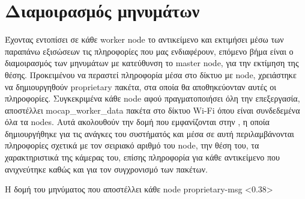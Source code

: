 \section{Διαμοιρασμός μηνυμάτων}
Έχοντας εντοπίσει σε κάθε worker node το αντικείμενο και εκτιμήσει μέσω των παραπάνω εξισώσεων τις πληροφορίες που μας ενδιαφέρουν, επόμενο βήμα είναι ο διαμοιρασμός των μηνυμάτων με κατεύθυνση το master node, για την εκτίμηση της θέσης. Προκειμένου να περαστεί πληροφορία μέσα στο δίκτυο με node, χρειάστηκε να δημιουργηθούν proprietary πακέτα, στα οποία θα αποθηκεύονταν αυτές οι πληροφορίες. Συγκεκριμένα κάθε node αφού πραγματοποιήσει όλη την επεξεργασία, α\-πο\-στέ\-λλει mocap\_worker\_data πακέτα στο δίκτυο Wi-Fi όπου είναι συνδεδεμένα όλα τα nodes. Αυτά ακολουθούν την δομή που εμφανίζονται στην , η οποία δημιουργήθηκε για τις ανάγκες του συστήματός και μέσα σε αυτή πε\-ρι\-λα\-μβά\-νο\-νται πληροφορίες σχετικά με τον σειριακό αριθμό του node, την θέση του, τα χα\-ρα\-κτη\-ρι\-στι\-κά της κάμερας του, επίσης πληροφορία για κάθε αντικείμενο που ανιχνεύτηκε καθώς και για τον συγχρονισμό των πακέτων. 

{Η δομή του μηνύματος που αποστέλλει κάθε node} %
{proprietary-msg} %
<0.38>


